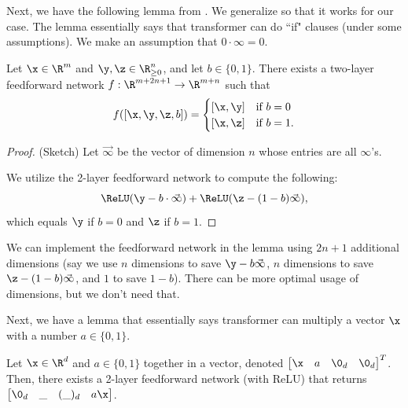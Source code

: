 Next, we have the following lemma from \cite{perez2021attention}. We generalize so that it works for our case. The lemma essentially says that transformer can do ``if" clauses (under some assumptions). We make an assumption that $0 \cdot \infty = 0$.

\begin{lemma} \label{lem:if clause for non-neg entries}
    Let $\x \in \R^m$ and $\y, \z \in \R_{\geq 0}^n$, and let $b \in \{0, 1\}$. There exists a two-layer feedforward network $f : \R^{m + 2n +1} \to \R^{m+n}$ such that
    \begin{equation*}
        f([\x, \y, \z, b]) = \begin{cases}
            [\x, \y] &\text{if $b=0$} \\
            [\x, \z] &\text{if $b=1$}.
        \end{cases}
    \end{equation*}    
\end{lemma}

\begin{proof} (Sketch)
    Let $\vec{\infty}$ be the vector of dimension $n$ whose entries are all $\infty$'s.  

    We utilize the 2-layer feedforward network to compute the following:
    $$\ReLU(\y - b \cdot \vec{\infty}) + \ReLU(\z - (1-b) \vec{\infty}),$$
    which equals $\y$ if $b = 0$ and $\z$ if $b = 1$.
\end{proof}

\begin{remark}
    We can implement the feedforward network in the lemma using $2n+1$ additional dimensions (say we use $n$ dimensions to save $\y - b \vec{\infty}$, $n$ dimensions to save $\z - (1-b) \vec{\infty}$, and $1$ to save $1-b$). There can be more optimal usage of dimensions, but we don't need that. 
\end{remark}

Next, we have a lemma that essentially says transformer can multiply a vector $\x$ with a number $a \in \{0, 1\}$. 

\begin{lemma} \label{lem:mult vect by 0 or 1}
    Let $\x \in \R^d$ and $a \in \{0, 1\}$ together in a vector, denoted $\begin{bmatrix}
        \x &a &\0_d &\0_d
    \end{bmatrix}^T$. Then, there exists a 2-layer feedforward network (with ReLU) that returns $\begin{bmatrix}
        \0_d &\_ &(\_)_d &a \x
    \end{bmatrix}$. 
\end{lemma}

